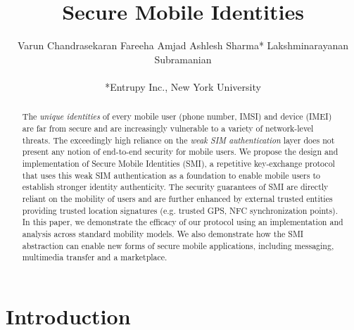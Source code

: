 \documentclass[letterpaper,twocolumn]{sig-alternate}
\begin{document}
\title{Secure Mobile Identities}


\author{Varun Chandrasekaran \hphantom{xy} Fareeha Amjad \hphantom{xy}Ashlesh Sharma* \hphantom{xy} Lakshminarayanan Subramanian \\
\\
*Entrupy Inc., New York University}



\maketitle

\setcounter{secnumdepth}{5}

\begin{abstract} 

The {\em unique identities} of every mobile user (phone number, IMSI) and device (IMEI) are far from secure and are increasingly vulnerable to a variety of network-level threats. The exceedingly high reliance on the {\em weak SIM authentication} layer does not present any notion of end-to-end security for mobile users. We propose the design and implementation of Secure Mobile Identities (SMI), a repetitive key-exchange protocol that uses this weak SIM authentication as a foundation to enable mobile users to establish stronger identity authenticity. 
The security guarantees of SMI are directly reliant on the mobility of users and are further enhanced by external trusted entities providing trusted location signatures (e.g. trusted GPS, NFC synchronization points). In this paper, we demonstrate the efficacy of our protocol using an implementation and analysis across standard mobility models. We also demonstrate how the SMI abstraction can enable new forms of secure mobile applications, including messaging, multimedia transfer and a marketplace.

\end{abstract}
 \section{Introduction}
\label{intro}
\end{document}
